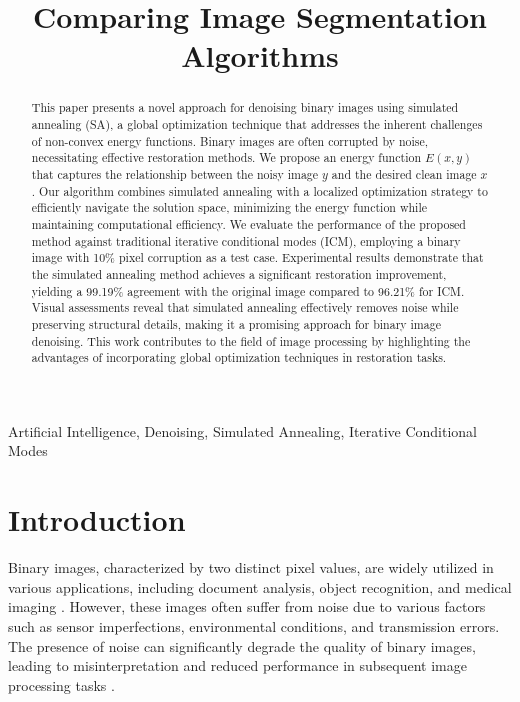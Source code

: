 \documentclass[conference]{IEEEtran}
\begin{document}
\title{Comparing Image Segmentation Algorithms}



\author{   }
\maketitle

\begin{abstract}

This paper presents a novel approach for denoising binary images using simulated annealing (SA), a global optimization technique that addresses the inherent challenges of non-convex energy functions. Binary images are often corrupted by noise, necessitating effective restoration methods. We propose an energy function \(E(x, y)\) that captures the relationship between the noisy image \(y\) and the desired clean image \(x\). Our algorithm combines simulated annealing with a localized optimization strategy to efficiently navigate the solution space, minimizing the energy function while maintaining computational efficiency. We evaluate the performance of the proposed method against traditional iterative conditional modes (ICM), employing a binary image with 10\% pixel corruption as a test case. Experimental results demonstrate that the simulated annealing method achieves a significant restoration improvement, yielding a 99.19\% agreement with the original image compared to 96.21\% for ICM. Visual assessments reveal that simulated annealing effectively removes noise while preserving structural details, making it a promising approach for binary image denoising. This work contributes to the field of image processing by highlighting the advantages of incorporating global optimization techniques in restoration tasks.

\end{abstract}
\begin{IEEEkeywords}
Artificial Intelligence, Denoising, Simulated Annealing, Iterative Conditional Modes
\end{IEEEkeywords}


\section{Introduction}
\vspace{1em}
Binary images, characterized by two distinct pixel values, are widely utilized in various applications, including document analysis, object recognition, and medical imaging \cite{abu2013skeletonization}. However, these images often suffer from noise due to various factors such as sensor imperfections, environmental conditions, and transmission errors. The presence of noise can significantly degrade the quality of binary images, leading to misinterpretation and reduced performance in subsequent image processing tasks \cite{kanwal2022devil}.
\end{document}
